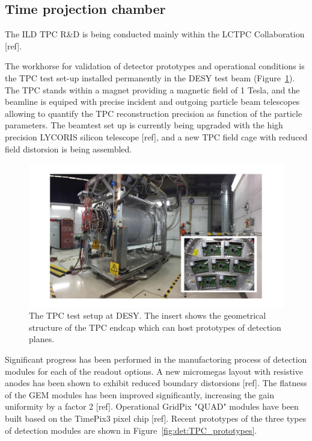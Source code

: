 \subsection{Time projection chamber}

The ILD TPC R\&D is being conducted mainly within the LCTPC Collaboration [ref]. 

The workhorse for validation of detector prototypes and operational conditions is the TPC test set-up installed permanently in the DESY test beam (Figure~\ref{fig:det:TPC_test_setup}). The TPC stands within a magnet providing a magnetic field of 1 Tesla, and the beamline is equiped with precise incident and outgoing particle beam telescopes allowing to quantify the TPC reconstruction precision as function of the particle parameters. The beamtest set up is currently being upgraded with the high precision LYCORIS silicon telescope [ref], and a new TPC field cage with reduced field distorsion is being assembled.

\begin{figure}[t!]
\centering
\includegraphics[width=1.0\hsize]{Detector/fig/TPC_test_setup.jpg}
\caption{The TPC test setup at DESY. The insert shows the geometrical structure of the TPC endcap which can host prototypes of detection planes.}
\label{fig:det:TPC_test_setup}
\end{figure}

Significant progress has been performed in the manufactoring process of detection modules for each of the readout options. A new micromegas layout with resistive anodes has been shown to exhibit reduced boundary distorsions [ref]. The flatness of the GEM modules has been improved significantly, increasing the gain uniformity by a factor 2 [ref]. Operational GridPix "QUAD" modules have been built based on the TimePix3 pixel chip [ref]. Recent prototypes of the three types of detection modules are shown in Figure~\ref{fig:det:TPC_prototypes}.  

